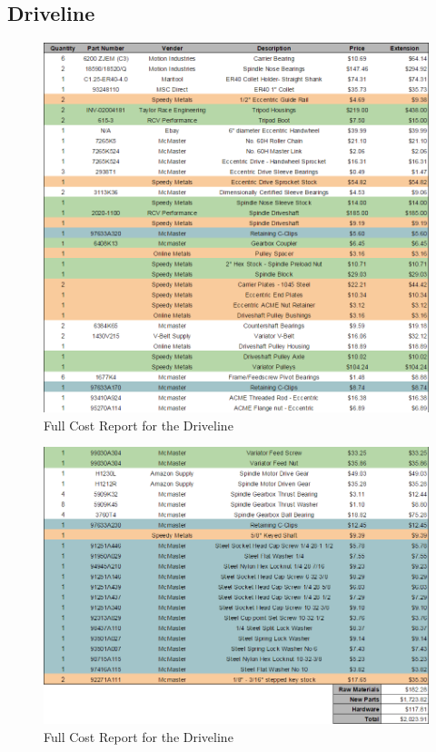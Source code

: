 \newpage

\subsection{Driveline}

\begin{figure}[H]
    \centering
    \includegraphics[width=1.0\textwidth]{./fall-report pictures/Chapter4-BillofMaterials/CRD1}
    \caption{Full Cost Report for the Driveline}
    \label{fig:CRD}
\end{figure}
\begin{figure}[H]
    \centering
    \includegraphics[width=1.0\textwidth]{./fall-report pictures/Chapter4-BillofMaterials/CRD2}
    \caption{Full Cost Report for the Driveline}
    \label{fig:CRD}
\end{figure}

